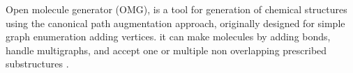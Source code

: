 Open molecule generator (OMG), is a tool for generation of chemical structures using the canonical path augmentation approach, originally designed for simple graph enumeration adding vertices. it can make molecules by adding bonds, handle multigraphs, and accept one or multiple non overlapping prescribed substructures \cite{Peironcely_2012}. 